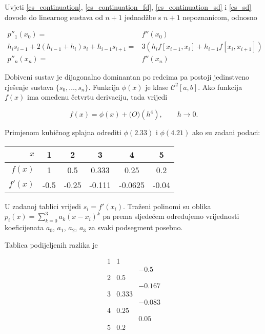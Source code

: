 Uvjeti \ref{cs_continuation}, \ref{cs_continuation_fd}, \ref{cs_continuation_sd} i \ref{cs_sd} dovode do linearnog sustava od $n+1$ jednadžbe s $n+1$ nepoznanicom, odnosno

\begin{align*}
p''_1(x_0) =& f''(x_0)\\
h_is_{i-1}+2(h_{i-1}+h_i)s_i+h_{i-1}s_{i+1}=&3(h_if[x_{i-1},x_i]+h_{i-1}f[x_i,x_{i+1}])\\
p''_n(x_n) =& f''(x_n)
\end{align*}

Dobiveni sustav je dijagonalno dominantan po redcima pa postoji jedinstveno rješenje sustava $\{s_0,\dots,s_n\}$. Funkcija $\phi(x)$ je klase $\mathcal{C}^2[a,b]$. Ako funkcija $f(x)$ ima omeđenu četvrtu derivaciju, tada vrijedi

$$
f(x)=\phi(x) + \mathcal(O)(h^4),\qquad h\to0.
$$

\newpage

\begin{examplebox}
    Primjenom kubičnog splajna odrediti $\phi(2.33)$ i $\phi(4.21)$ ako su zadani podaci:
    
    \center
    \begin{tabular}{r|c|c|c|c|c}
        $x$ & 1 & 2 & 3 & 4 & 5 \\
        \hline
        $f(x)$ & 1 & 0.5 & 0.333 & 0.25 & 0.2 \\
        \hline
        $f'(x)$ & -0.5 & -0.25 & -0.111 & -0.0625 & -0.04
    \end{tabular}
\end{examplebox}

U zadanoj tablici vrijedi $s_i=f'(x_i)$. Traženi polinomi su oblika $p_i(x)=\sum_{k=0}^3a_k(x-x_i)^k$ pa prema sljedećem određujemo vrijednosti koeficijenata $a_0$, $a_1$, $a_2$, $a_3$ za svaki podsegment posebno.

Tablica podijeljenih razlika je

$$
\begin{array}{ccc}
1&1&\\
&&-0.5\\
2&0.5\\
&&-0.167\\
3&0.333\\
&&-0.083\\
4&0.25\\
&&0.05\\
5&0.2\\
\end{array}
$$

